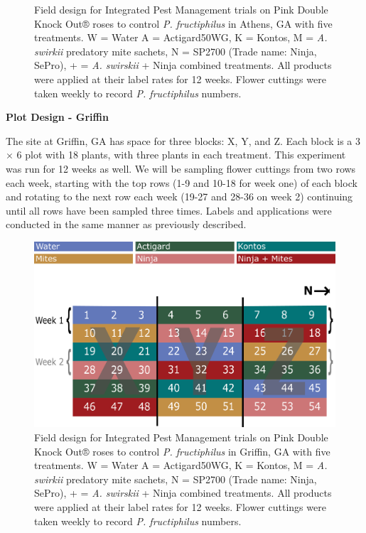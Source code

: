 \documentclass[12pt,final,CPage]{ufthesis}
\begin{document}
{\begin{figure}
{  }

  \caption{Field design for Integrated Pest Management trials on Pink Double Knock Out® roses to control \textit{P. fructiphilus} in Athens, GA with five treatments. W = Water A = Actigard50WG, K = Kontos, M = \textit{A. swirkii} predatory mite sachets, N = SP2700 (Trade name: Ninja, SePro), + = \textit{A. swirskii} + Ninja combined treatments. All products were applied at their label rates for 12 weeks. Flower cuttings were taken weekly to record \textit{P. fructiphilus} numbers.}\label{fig:ipm-athens}
  \end{figure}
  \textbf{Plot Design - Griffin}

  The site at Griffin, GA has space for three blocks: X, Y, and Z. Each block is a 3 \(\times\) 6 plot with 18 plants, with three plants in each treatment. This experiment was run for 12 weeks as well. We will be sampling flower cuttings from two rows each week, starting with the top rows (1-9 and 10-18 for week one) of each block and rotating to the next row each week (19-27 and 28-36 on week 2) continuing until all rows have been sampled three times. Labels and applications were conducted in the same manner as previously described.
  \begin{figure}

  {\centering \includegraphics[width=0.8\linewidth]{figure/rrv_ipm_plot_map_2019_griffin} 

  }

  \caption{Field design for Integrated Pest Management trials on Pink Double Knock Out® roses to control \textit{P. fructiphilus} in Griffin, GA with five treatments. W = Water A = Actigard50WG, K = Kontos, M = \textit{A. swirkii} predatory mite sachets, N = SP2700 (Trade name: Ninja, SePro), + = \textit{A. swirskii} + Ninja combined treatments. All products were applied at their label rates for 12 weeks. Flower cuttings were taken weekly to record \textit{P. fructiphilus} numbers.}\label{fig:ipm-griff}
  \end{figure}
  \begin{figure}


\end{figure}}
\end{document}
